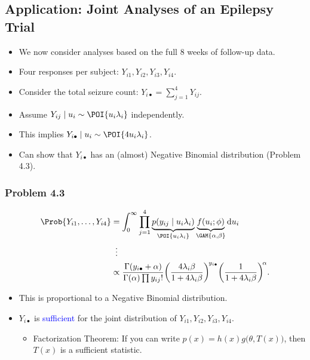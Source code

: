 \documentclass[oneside]{book}\usepackage[]{graphicx}\usepackage[svgnames]{xcolor}
\begin{document}
\subsection*{Application: Joint Analyses of an Epilepsy Trial}
\begin{itemize}
      \item We now consider analyses based on the full 8 weeks of follow-up data.
      \item Four responses per subject: $ Y_{i1},Y_{i2},Y_{i3},Y_{i4} $.
      \item Consider the total seizure count: $ Y_{i\bullet}=\sum_{j=1}^{4}Y_{ij} $.
      \item Assume $ Y_{ij}\mid u_i \sim \POI{u_i\lambda_i} $ independently.
      \item This implies \textcolor{Blue}{$ Y_{i\bullet}\mid u_i \sim \POI{4u_i\lambda_i} $}.
      \item Can show that $ Y_{i\bullet} $ has an (almost) Negative Binomial distribution (Problem 4.3).
\end{itemize}
\subsubsection*{Problem 4.3}
\begin{align*}
      \Prob{Y_{i1},\ldots,Y_{i4}}
       & =\int_{0}^{\infty}\prod_{j=1}^4\underbrace{p(y_{ij}\mid u_i\lambda_i)}_{\POI{u_i\lambda_i}}\underbrace{f(u_i;\phi)}_{\GAM{\alpha,\beta}}\odif{u_i}                                                   \\
       & \vdotswithin{=}                                                                                                                                                                                      \\
       & \propto \frac{\Gamma(y_{i\bullet}+\alpha)}{\Gamma(\alpha)\prod y_{ij}!}\biggl(\frac{4\lambda_i\beta}{1+4\lambda_i\beta}\biggr)^{\!y_{i\bullet}}\biggl(\frac{1}{1+4\lambda_i\beta}\biggr)^{\!\alpha}.
\end{align*}
\begin{itemize}
      \item This is proportional to a Negative Binomial distribution.
      \item $ Y_{i\bullet} $ is \textcolor{Blue}{sufficient} for the joint distribution of $ Y_{i1},Y_{i2},Y_{i3},Y_{i4} $.
            \begin{itemize}
                  \item Factorization Theorem: If you can write $ p(x)=h(x)g\bigl(\theta,T(x)\bigr) $, then $ T(x) $ is a sufficient statistic.
            \end{itemize}
\end{itemize}
\end{document}
